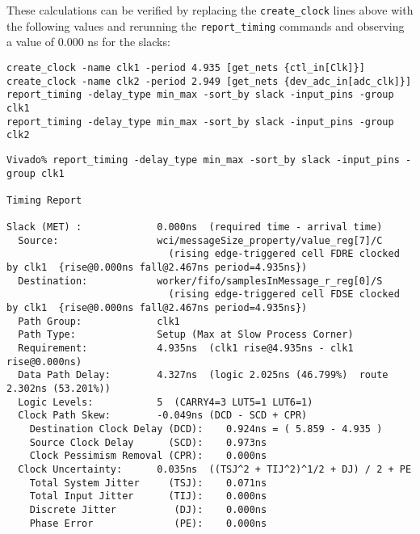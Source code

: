 \documentclass{article}
\begin{document}
\fontsize{10}{12}\selectfont
These calculations can be verified by replacing the \texttt{create\_clock} lines above with the following values and rerunning the \texttt{report\_timing} commands and observing a value of 0.000 ns for the slacks:
\begin{lstlisting}
create_clock -name clk1 -period 4.935 [get_nets {ctl_in[Clk]}]
create_clock -name clk2 -period 2.949 [get_nets {dev_adc_in[adc_clk]}]
report_timing -delay_type min_max -sort_by slack -input_pins -group clk1
report_timing -delay_type min_max -sort_by slack -input_pins -group clk2
\end{lstlisting}
\fontsize{6}{12}\selectfont
\begin{lstlisting}
Vivado% report_timing -delay_type min_max -sort_by slack -input_pins -group clk1

Timing Report

Slack (MET) :             0.000ns  (required time - arrival time)
  Source:                 wci/messageSize_property/value_reg[7]/C
                            (rising edge-triggered cell FDRE clocked by clk1  {rise@0.000ns fall@2.467ns period=4.935ns})
  Destination:            worker/fifo/samplesInMessage_r_reg[0]/S
                            (rising edge-triggered cell FDSE clocked by clk1  {rise@0.000ns fall@2.467ns period=4.935ns})
  Path Group:             clk1
  Path Type:              Setup (Max at Slow Process Corner)
  Requirement:            4.935ns  (clk1 rise@4.935ns - clk1 rise@0.000ns)
  Data Path Delay:        4.327ns  (logic 2.025ns (46.799%)  route 2.302ns (53.201%))
  Logic Levels:           5  (CARRY4=3 LUT5=1 LUT6=1)
  Clock Path Skew:        -0.049ns (DCD - SCD + CPR)
    Destination Clock Delay (DCD):    0.924ns = ( 5.859 - 4.935 ) 
    Source Clock Delay      (SCD):    0.973ns
    Clock Pessimism Removal (CPR):    0.000ns
  Clock Uncertainty:      0.035ns  ((TSJ^2 + TIJ^2)^1/2 + DJ) / 2 + PE
    Total System Jitter     (TSJ):    0.071ns
    Total Input Jitter      (TIJ):    0.000ns
    Discrete Jitter          (DJ):    0.000ns
    Phase Error              (PE):    0.000ns


\end{lstlisting}
\end{document}
